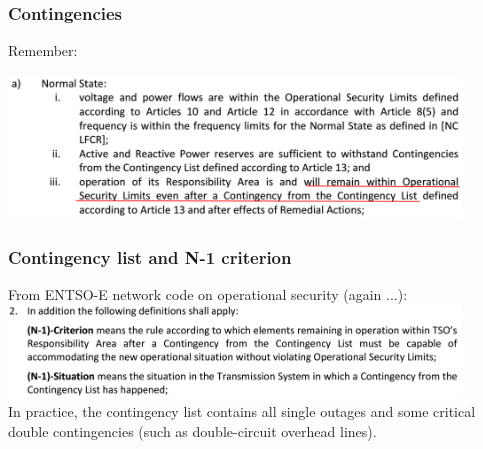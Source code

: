 \documentclass[compress]{beamer}
\begin{document}
\begin{frame}
  \frametitle{Contingencies}
Remember:
\begin{block}{}
\end{block}
\includegraphics[width=0.9\textwidth]{Figs/NormalStateContingencies.png}
\end{frame}

\begin{frame}
  \frametitle{Contingency list and N-1 criterion}
  \begin{block}{}
From ENTSO-E network code on operational security (again ...):\\
\includegraphics[width=0.9\textwidth]{Figs/N-1_definition.png}\\
In practice, the contingency list contains all single outages and some critical double contingencies (such as double-circuit overhead lines).
\end{block}
\end{frame}
\end{document}
